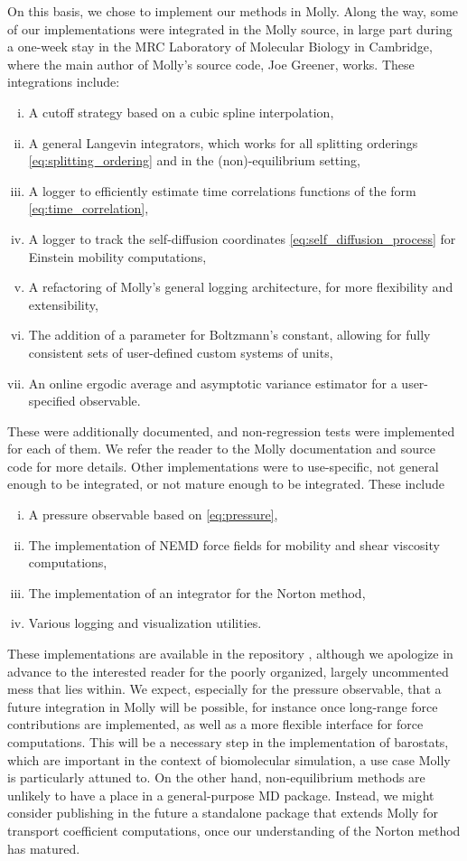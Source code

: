 On this basis, we chose to implement our methods in Molly. Along the way, some of our implementations were integrated in the Molly source, in large part during a one-week stay in the MRC Laboratory of Molecular Biology in Cambridge, where the main author of Molly's source code, Joe Greener, works.
These integrations include:
\begin{enumerate}[i)]
    \item A cutoff strategy based on a cubic spline interpolation,
    \item A general Langevin integrators, which works for all splitting orderings \eqref{eq:splitting_ordering} and in the (non)-equilibrium setting,
    \item A logger to efficiently estimate time correlations functions of the form \eqref{eq:time_correlation},
    \item A logger to track the self-diffusion coordinates \eqref{eq:self_diffusion_process} for Einstein mobility computations,
    \item A refactoring of Molly's general logging architecture, for more flexibility and extensibility,
    \item The addition of a parameter for Boltzmann's constant, allowing for fully consistent sets of user-defined custom systems of units,
    \item An online ergodic average and asymptotic variance estimator for a user-specified observable.
\end{enumerate}
These were additionally documented, and non-regression tests were implemented for each of them. We refer the reader to the Molly documentation and source code for more details.
Other implementations were to use-specific, not general enough to be integrated, or not mature enough to be integrated. These include
\begin{enumerate}[i)]
    \item A pressure observable based on \eqref{eq:pressure},
    \item The implementation of NEMD force fields for mobility and shear viscosity computations,
    \item The implementation of an integrator for the Norton method,
    \item Various logging and visualization utilities.
\end{enumerate}
These implementations are available in the repository \cite{myrepo}, although we apologize in advance to the interested reader for the poorly organized, largely uncommented mess that lies within.
We expect, especially for the pressure observable, that a future integration in Molly will be possible, for instance once long-range force contributions are implemented, as well as a more flexible interface for force computations.
This will be a necessary step in the implementation of barostats, which are important in the context of biomolecular simulation, a use case Molly is particularly attuned to.
On the other hand, non-equilibrium methods are unlikely to have a place in a general-purpose MD package.
Instead, we might consider publishing in the future a standalone package that extends Molly for transport coefficient computations, once our understanding of the Norton method has matured.
